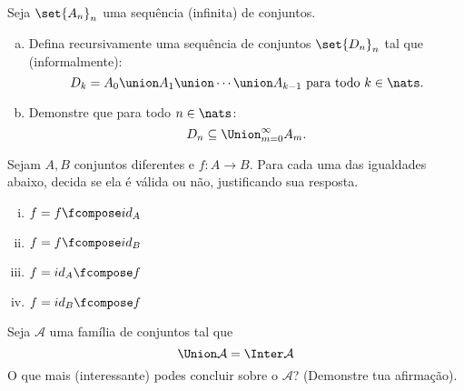\begin{exercise}
    Seja $\set{A_n}_n$ uma sequência (infinita) de conjuntos.
    \begin{enumerate}[(a)]
        \item Defina recursivamente uma sequência de conjuntos $\set{D_n}_n$ tal que (informalmente):
            $$
                D_k = A_0 \union A_1 \union \cdots \union A_{k - 1} \text{ para todo } k \in \nats.
            $$
        \item Demonstre que para todo $n \in \nats$:
            $$
                D_n \subseteq \Union^{\infty}_{m = 0} A_m.
            $$
    \end{enumerate}
\end{exercise}

\begin{exercise}
    Sejam $A,B$ conjuntos diferentes e $f:A \to B$. Para cada uma das igualdades abaixo, decida se ela é válida ou não, justificando sua resposta.
    \begin{enumerate}[(i)]
        \item $f = f \fcompose id_A$
        \item $f = f \fcompose id_B$
        \item $f = id_A \fcompose f$
        \item $f = id_B \fcompose f$
    \end{enumerate}
\end{exercise}

\begin{exercise}
    Seja $\mathcal A$ uma família de conjuntos tal que
    $$
        \Union \mathcal A = \Inter \mathcal A
    $$
    O que mais (interessante) podes concluir sobre o $\mathcal A$? (Demonstre tua afirmação).
\end{exercise}
